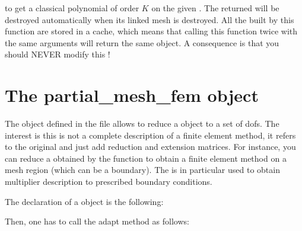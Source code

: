 \documentclass[a4paper,11pt,english]{sphinxmanual}
\begin{document}
to get a classical polynomial  of order \(K\) on the given .
The returned  will be destroyed automatically when its linked mesh is
destroyed. All the  built by this function are stored in a cache, which means
that calling this function twice with the same arguments will return the same 
object. A consequence is that you should NEVER modify this !


\section{The partial\_mesh\_fem object}
\label{\detokenize{userdoc/bfem:the-partial-mesh-fem-object}}
The  object defined in the file
 allows to reduce a  object to a set of dofs.
The interest is this is not a complete description of a finite element method, it
refers to the original  and just add reduction and extension matrices. For
instance, you can reduce a  obtained by the function
 to obtain a finite element method on a
mesh region (which can be a boundary). The  is in
particular used to obtain multiplier description to prescribed boundary
conditions.

The declaration of a  object is the following:

\begin{sphinxVerbatim}[commandchars=\\\{\}]
 
\end{sphinxVerbatim}

Then, one has to call the adapt method as follows:

\begin{sphinxVerbatim}[commandchars=\\\{\}]
   
\end{sphinxVerbatim}
\end{document}

